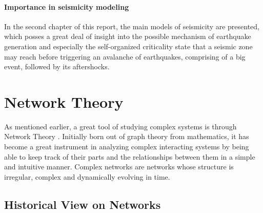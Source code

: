 \paragraph{Importance in seismicity modeling} \par 

In the second chapter of this report, the main models of seismicity are presented, which posses a great deal of insight into the possible mechanism of earthquake generation and especially the self-organized criticality state that a seismic zone may reach before triggering an avalanche of earthquakes, comprising of a big event, followed by its aftershocks.



\section{Network Theory}
As mentioned earlier, a great tool of studying complex systems is through Network Theory \cite{latora}. Initially born out of graph theory from mathematics, it has become a great instrument in analyzing complex interacting systems by being able to keep track of their parts and the relationships between them in a simple and intuitive manner. Complex networks are networks whose structure is irregular, complex and dynamically evolving in time.\par 

\subsection{Historical View on Networks}

